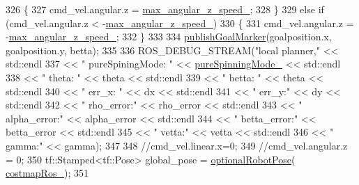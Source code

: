\begin{DoxyCode}
{326     \{
327         cmd\_vel.angular.z = \hyperlink{classmove__base__z__client_1_1backward__local__planner_1_1BackwardLocalPlanner_a8b5cbc273dfcf1c5e15ac4475b45ca97}{max\_angular\_z\_speed\_};
328     \}
329     \textcolor{keywordflow}{else} \textcolor{keywordflow}{if} (cmd\_vel.angular.z < -\hyperlink{classmove__base__z__client_1_1backward__local__planner_1_1BackwardLocalPlanner_a8b5cbc273dfcf1c5e15ac4475b45ca97}{max\_angular\_z\_speed\_})
330     \{
331         cmd\_vel.angular.z = -\hyperlink{classmove__base__z__client_1_1backward__local__planner_1_1BackwardLocalPlanner_a8b5cbc273dfcf1c5e15ac4475b45ca97}{max\_angular\_z\_speed\_};
332     \}
333 
334     \hyperlink{classmove__base__z__client_1_1backward__local__planner_1_1BackwardLocalPlanner_a691e565d33666d2f7004e791cae29b42}{publishGoalMarker}(goalposition.x, goalposition.y, betta);
335 
336     ROS\_DEBUG\_STREAM(\textcolor{stringliteral}{"local planner,"} << std::endl
337                                       << \textcolor{stringliteral}{" pureSpiningMode: "} << 
      \hyperlink{classmove__base__z__client_1_1backward__local__planner_1_1BackwardLocalPlanner_abf2b84c0d7a841a7fcec1b93bf5fdd0e}{pureSpinningMode\_} << std::endl
338                                       << \textcolor{stringliteral}{" theta: "} << theta << std::endl
339                                       << \textcolor{stringliteral}{" betta: "} << theta << std::endl
340                                       << \textcolor{stringliteral}{" err\_x: "} << dx << std::endl
341                                       << \textcolor{stringliteral}{" err\_y:"} << dy << std::endl
342                                       << \textcolor{stringliteral}{" rho\_error:"} << rho\_error << std::endl
343                                       << \textcolor{stringliteral}{" alpha\_error:"} << alpha\_error << std::endl
344                                       << \textcolor{stringliteral}{" betta\_error:"} << betta\_error << std::endl
345                                       << \textcolor{stringliteral}{" vetta:"} << vetta << std::endl
346                                       << \textcolor{stringliteral}{" gamma:"} << gamma);
347 
348     \textcolor{comment}{//cmd\_vel.linear.x=0;}
349     \textcolor{comment}{//cmd\_vel.angular.z = 0;    }
350     tf::Stamped<tf::Pose> global\_pose = \hyperlink{namespacemove__base__z__client_1_1backward__local__planner_a80dbd10807e5f70adfcd0ff4dcb7c1db}{optionalRobotPose}(
      \hyperlink{classmove__base__z__client_1_1backward__local__planner_1_1BackwardLocalPlanner_a865618f84238fe6ff437d1e38ec5fec0}{costmapRos\_});
351 
}
\end{DoxyCode}
